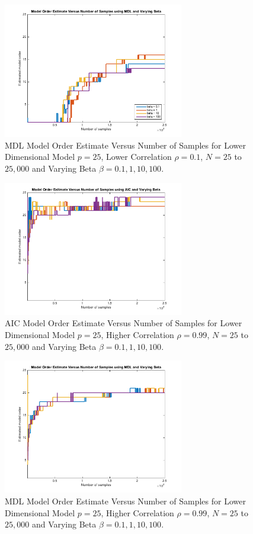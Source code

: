 \documentclass[journal]{IEEEtran}
\begin{document}
\begin{figure}[h]
\centering
\includegraphics[width=3.1in]{../images/deviation_mdl_01.png}
\caption{MDL Model Order Estimate Versus Number of Samples for Lower Dimensional Model \(p = 25\), Lower Correlation \(\rho = 0.1\), \(N = 25\) to \(25,000\) and Varying Beta \(\beta = {0.1, 1, 10, 100}\).}
\label{fig:mdldev01}
\end{figure}

\begin{figure}[h]
\centering
\includegraphics[width=3.1in]{../images/deviation_aic_099.png}
\caption{AIC Model Order Estimate Versus Number of Samples for Lower Dimensional Model \(p = 25\), Higher Correlation \(\rho = 0.99\), \(N = 25\) to \(25,000\) and Varying Beta \(\beta = {0.1, 1, 10, 100}\).}
\label{fig:aicdev99}
\end{figure}

\begin{figure}[h]
\centering
\includegraphics[width=3.1in]{../images/deviation_mdl_099.png}
\caption{MDL Model Order Estimate Versus Number of Samples for Lower Dimensional Model \(p = 25\), Higher Correlation \(\rho = 0.99\), \(N = 25\) to \(25,000\) and Varying Beta \(\beta = {0.1, 1, 10, 100}\).}
\label{fig:mdldev99}
\end{figure}
\end{document}
